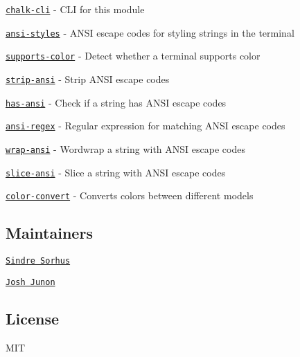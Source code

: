 \begin{DoxyItemize}
\item \href{https://github.com/chalk/chalk-cli}{\tt chalk-\/cli} -\/ C\+LI for this module
\item \href{https://github.com/chalk/ansi-styles}{\tt ansi-\/styles} -\/ A\+N\+SI escape codes for styling strings in the terminal
\item \href{https://github.com/chalk/supports-color}{\tt supports-\/color} -\/ Detect whether a terminal supports color
\item \href{https://github.com/chalk/strip-ansi}{\tt strip-\/ansi} -\/ Strip A\+N\+SI escape codes
\item \href{https://github.com/chalk/has-ansi}{\tt has-\/ansi} -\/ Check if a string has A\+N\+SI escape codes
\item \href{https://github.com/chalk/ansi-regex}{\tt ansi-\/regex} -\/ Regular expression for matching A\+N\+SI escape codes
\item \href{https://github.com/chalk/wrap-ansi}{\tt wrap-\/ansi} -\/ Wordwrap a string with A\+N\+SI escape codes
\item \href{https://github.com/chalk/slice-ansi}{\tt slice-\/ansi} -\/ Slice a string with A\+N\+SI escape codes
\item \href{https://github.com/qix-/color-convert}{\tt color-\/convert} -\/ Converts colors between different models
\end{DoxyItemize}

\subsection*{Maintainers}


\begin{DoxyItemize}
\item \href{https://github.com/sindresorhus}{\tt Sindre Sorhus}
\item \href{https://github.com/qix-}{\tt Josh Junon}
\end{DoxyItemize}

\subsection*{License}

M\+IT 